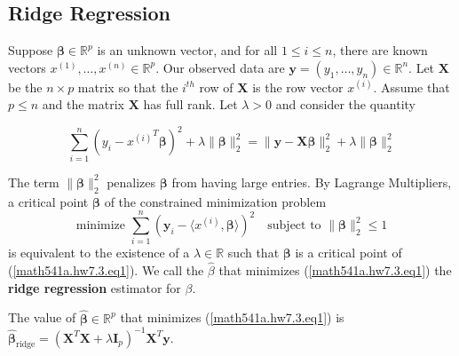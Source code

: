 \subsection{Ridge Regression}
Suppose $\boldsymbol{\beta}\in\mathbb{R}^{p}$ is an unknown vector, and for all $1\leq i\leq n$, there are known vectors $x^{(1)},\ldots,x^{(n)}\in\mathbb{R}^{p}$.  Our observed data are $\boldsymbol{y} = (y_{1},\ldots,y_{n})\in\mathbb{R}^n$. Let $\boldsymbol{X}$ be the $n\times p$ matrix so that the $i^{th}$ row of $\boldsymbol{X}$ is the row vector $x^{(i)}$.  Assume that $p\leq n$ and the matrix $\boldsymbol{X}$ has full rank. Let $\lambda>0$ and consider the quantity

\begin{equation}\label{math541a.hw7.3.eq1}
 \sum_{i=1}^{n}\left(y_{i}-{x^{(i)}}^T\boldsymbol{\beta} \right )^{2}+\lambda\lVert \boldsymbol{\beta}\rVert_2^{2} = \lVert \boldsymbol{y} - \boldsymbol{X} \boldsymbol{\beta} \rVert_2^2 +\lambda\lVert \boldsymbol{\beta}\rVert_2^{2}
\end{equation}

 The term $\lVert \boldsymbol{\beta} \rVert_2^{2}$ penalizes $\boldsymbol{\beta}$ from having large entries.  By Lagrange Multipliers, a critical point $\boldsymbol{\beta}$ of the constrained minimization problem
$$\mbox{minimize}\,\,\sum_{i=1}^{n}(\boldsymbol{y}_{i}-\langle x^{(i)},\boldsymbol{\beta}\rangle)^{2}\quad \mbox{subject}\,\,\mbox{to}\,\,\lVert \boldsymbol{\beta}\rVert_2^{2}\leq 1$$
is equivalent to the existence of a $\lambda\in\mathbb{R}$ such that $\boldsymbol{\beta}$ is a critical point of (\ref{math541a.hw7.3.eq1}). We call the \(\hat{\beta}\) that minimizes (\ref{math541a.hw7.3.eq1}) the \textbf{ridge regression} estimator for \(\beta\).

\begin{proposition}

The value of $\hat{\boldsymbol{\beta}}\in\mathbb{R}^{p}$ that minimizes (\ref{math541a.hw7.3.eq1}) is \(\hat{\boldsymbol{\beta}}_{\text{ridge}} = (\boldsymbol{X}^T\boldsymbol{X} + \lambda \boldsymbol{I}_p)^{-1}\boldsymbol{X}^T \boldsymbol{y}\).

\end{proposition}


